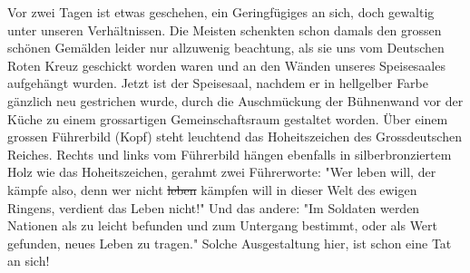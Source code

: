 \def\day{17. Mai 1943 *}
\mktitle

Vor zwei Tagen ist etwas geschehen, ein Geringf\"{u}giges an sich, doch gewaltig unter unseren Verh\"{a}ltnissen.
Die Meisten schenkten schon damals den grossen sch\"{o}nen Gem\"{a}lden leider nur allzuwenig beachtung, als sie uns vom Deutschen Roten Kreuz geschickt worden waren und an den W\"{a}nden unseres Speisesaales aufgeh\"{a}ngt wurden.
Jetzt ist der Speisesaal, nachdem er in hellgelber Farbe g\"{a}nzlich neu gestrichen wurde, durch die Auschm\"{u}ckung der B\"{u}hnenwand vor der K\"{u}che zu einem grossartigen Gemeinschaftsraum gestaltet worden.
\"{U}ber einem grossen F\"{u}hrerbild (Kopf) steht leuchtend das Hoheitszeichen des Grossdeutschen Reiches.
Rechts und links vom F\"{u}hrerbild h\"{a}ngen ebenfalls in silberbronziertem Holz wie das Hoheitszeichen, gerahmt zwei F\"{u}hrerworte: "Wer leben will, der k\"{a}mpfe also, denn wer nicht \st{leben} k\"{a}mpfen will in dieser Welt des ewigen Ringens, verdient das Leben nicht!"
Und das andere: "Im Soldaten werden Nationen als zu leicht befunden und zum Untergang bestimmt, oder als Wert gefunden, neues Leben zu tragen."
Solche Ausgestaltung hier, ist schon eine Tat an sich!

\clearpage
